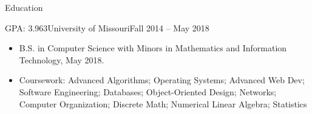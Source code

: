 \documentclass[]{mcdowellcv}
\begin{document}
	\makeheader
	
	\begin{cvsection}{Education}
		\begin{cvsubsection}{GPA: 3.963}{University of Missouri}{Fall 2014 -- May 2018}
			\begin{itemize}
				\item B.S. in Computer Science with Minors in Mathematics and Information Technology, May 2018.
				\item Coursework: Advanced Algorithms; Operating Systems; Advanced Web Dev; Software Engineering; Databases; Object-Oriented Design; Networks; Computer Organization; Discrete Math; Numerical Linear Algebra; Statistics
			\end{itemize}
		\end{cvsubsection}
	\end{cvsection}
    
\end{document}
